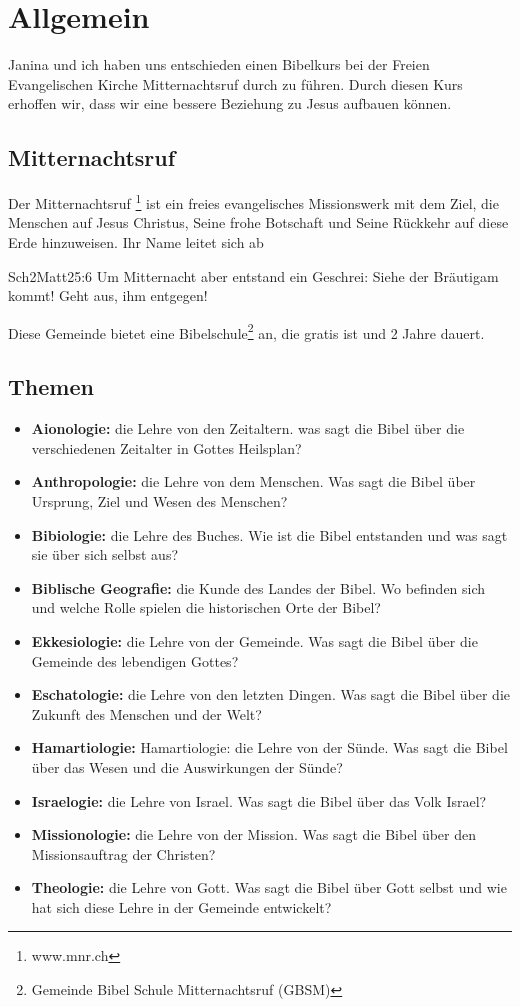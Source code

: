 \section{Allgemein}
Janina und ich haben uns entschieden einen Bibelkurs bei der Freien Evangelischen Kirche Mitternachtsruf durch zu führen. Durch diesen Kurs erhoffen wir, dass wir eine bessere Beziehung zu Jesus aufbauen können.

\subsection{Mitternachtsruf}
Der Mitternachtsruf \footnote{www.mnr.ch} ist ein freies evangelisches Missionswerk mit dem Ziel, die Menschen auf Jesus Christus, Seine frohe Botschaft und Seine Rückkehr auf diese Erde hinzuweisen. Ihr Name leitet sich ab \begin{bibeltext}{Sch2}{Matt}{25:6}
    			Um Mitternacht aber entstand ein Geschrei: \glqq Siehe der Bräutigam kommt! Geht aus, ihm entgegen!\grqq{}
    		\end{bibeltext}
Diese Gemeinde bietet eine Bibelschule\footnote{Gemeinde Bibel Schule Mitternachtsruf (GBSM)} an, die gratis ist und 2 Jahre dauert. 

\subsection{Themen}
\begin{itemize}
    \item \textbf{Aionologie: }die Lehre von den Zeitaltern. was sagt die Bibel über die verschiedenen Zeitalter in Gottes Heilsplan?
    \item \textbf{Anthropologie: }die Lehre von dem Menschen.
    Was sagt die Bibel über Ursprung, Ziel und Wesen des Menschen?
    \item \textbf{Bibiologie: }die Lehre des Buches. Wie ist die Bibel entstanden und was sagt sie über sich selbst aus?
    \item \textbf{Biblische Geografie: }die Kunde des Landes der Bibel. Wo befinden sich und welche Rolle spielen die historischen Orte der Bibel?
    \item \textbf{Ekkesiologie: }die Lehre von der Gemeinde. Was sagt die Bibel über die Gemeinde des lebendigen Gottes?
    \item \textbf{Eschatologie: }die Lehre von den letzten Dingen. Was sagt die Bibel über die Zukunft des Menschen und der Welt?
    \item \textbf{Hamartiologie: }Hamartiologie: die Lehre von der Sünde. Was sagt die Bibel über das Wesen und die
    Auswirkungen der Sünde?
    \item \textbf{Israelogie: }die Lehre von Israel. Was sagt die Bibel über das Volk Israel?
    \item \textbf{Missionologie: }die Lehre von der Mission. Was sagt die Bibel über den Missionsauftrag der Christen?
    \item \textbf{Theologie: }die Lehre von Gott. Was sagt die Bibel über Gott selbst und wie hat sich diese Lehre in der Gemeinde entwickelt?
\end{itemize}
